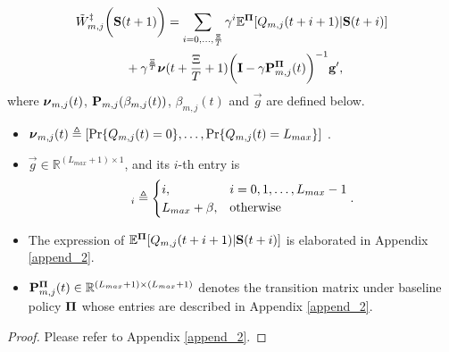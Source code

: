 \begin{lemma}
    \label{lemma:w_es}
    {\small
    \begin{align}
        &\tilde{W}^{\ddagger}_{m,j}\bigg(\mathbf{S}(t+1)\bigg)
    = \sum_{i=0,\dots,\frac{\Xi}{T}} \gamma^{i} \mathbb{E}^{\boldsymbol{\Pi}}[ Q_{m,j}({t+i+1}) | \mathbf{S}(t+i)]
    \nonumber\\
    &~~~~~~~~~~~~+ \gamma^{\frac{\Xi}{T}} 
    \boldsymbol{\nu}({t+\frac{\Xi}{T}+1})
    \bigg(
        \mathbf{I} - \gamma \mathbf{P}^{\boldsymbol{\Pi}}_{m,j}(t)
    \bigg)^{-1} \mathbf{g}',
        \label{w_es}
    \end{align}   
    }
    where $\boldsymbol{\nu}_{m,j}(t)$, $\mathbf{P}_{m,j}(\beta_{m,j}(t))$, $\beta_{m,j}(t)$ and $\vec{g}$ are defined below.
    \begin{itemize}
        \item {\small
        $\boldsymbol{\nu}_{m,j}(t) \triangleq [\Pr\{Q_{m,j}(t)=0\}, \dots, \Pr\{Q_{m,j}(t)=L_{max}\}]$
        }.
        \item $\vec{g} \in \mathbb{R}^{(L_{max}+1) \times 1}$, and its $i$-th entry is
        \begin{align}
            [\vec{g}]_{i} \define 
            \begin{cases}
                i, & i=0,1,\dots,L_{max}-1
                \\
                L_{max}+\beta, & \text{otherwise}
            \end{cases}.
            \label{eqn:g_vec}
        \end{align}
        \item The expression of $\mathbb{E}^{\boldsymbol{\Pi}}[ Q_{m,j}({t+i+1}) | \mathbf{S}(t+i)]$ is elaborated in Appendix \ref{append_2}.
        \item $\mathbf{P}^{\boldsymbol{\Pi}}_{m,j}(t) \in \mathbb{R}^{(L_{max}+1) \times (L_{max}+1)}$ denotes the transition matrix under baseline policy $\boldsymbol{\Pi}$ whose entries are described in Appendix \ref{append_2}.
    \end{itemize}   
\end{lemma}
\begin{proof}
    Please refer to Appendix \ref{append_2}.
\end{proof}

